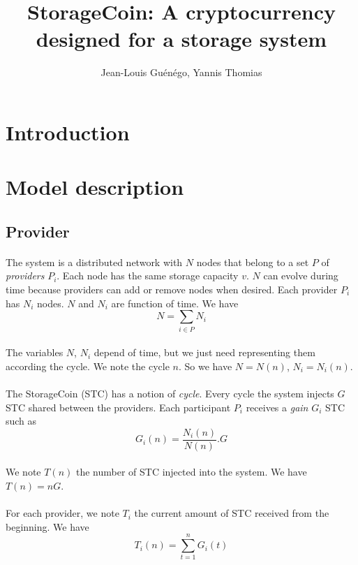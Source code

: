 \documentclass[a4paper,12pt]{article}
\title{StorageCoin: A cryptocurrency designed for a storage system}
\author{Jean-Louis Gu\'{e}n\'{e}go, Yannis Thomias}
\date{}
\begin{document}
\maketitle \clearpage
\tableofcontents \clearpage

\section{Introduction}
\section{Model description}
\subsection{Provider}

\paragraph*{}
The system is a distributed network with $N$ nodes that belong to a set $P$ of \emph{providers} $P_{i}$.
Each node has the same storage capacity $v$.
$N$ can evolve during time because providers can add or remove nodes  when desired. Each provider $P_{i}$ has $N_{i}$ nodes.
$N$ and $N_{i}$ are function of time. We have 
\[N=\sum\limits_{i\in{P}}N_{i}\]

\paragraph*{}
The variables $N$, $N_{i}$ depend of time, but we just need representing them according the cycle. We note the cycle $n$.
So we have $N=N(n)$, $N_{i}=N_{i}(n)$. 

\paragraph*{}
The StorageCoin (STC) has a notion of \emph{cycle}.
Every cycle the system injects $G$ STC shared between the providers.
Each participant $P_{i}$ receives a \emph{gain} $G_{i}$ STC such as
\[G_{i}(n)=\frac{N_{i}(n)}{N(n)}.G\]

\paragraph*{}
We note $T(n)$ the number of STC injected into the system. We have $T(n)=nG$.

\paragraph*{}
For each provider, we note $T_{i}$ the current amount of STC received from the beginning. We have
\[T_{i}(n)=\sum\limits_{t=1}^n G_{i}(t)\]
\end{document}

